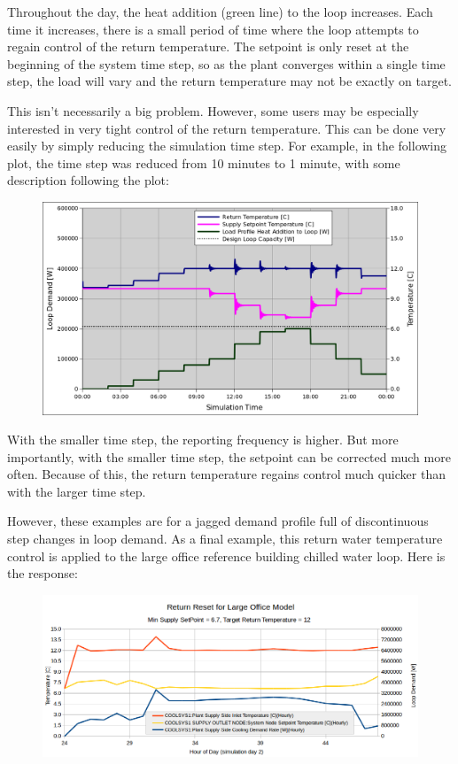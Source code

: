 Throughout the day, the heat addition (green line) to the loop increases. Each time it increases, there is a small period of time where the loop attempts to regain control of the return temperature. The setpoint is only reset at the beginning of the system time step, so as the plant converges within a single time step, the load will vary and the return temperature may not be exactly on target.

This isn't necessarily a big problem. However, some users may be especially interested in very tight control of the return temperature. This can be done very easily by simply reducing the simulation time step. For example, in the following plot, the time step was reduced from 10 minutes to 1 minute, with some description following the plot:

\begin{figure}[htbp]
\centering
\includegraphics{media/SetPointManager-ResetForReturnControl2.png}
\caption{}
\end{figure}

With the smaller time step, the reporting frequency is higher. But more importantly, with the smaller time step, the setpoint can be corrected much more often. Because of this, the return temperature regains control much quicker than with the larger time step.

However, these examples are for a jagged demand profile full of discontinuous step changes in loop demand. As a final example, this return water temperature control is applied to the large office reference building chilled water loop. Here is the response:

\begin{figure}[htbp]
\centering
\includegraphics{media/SetPointManager-ResetForReturnControl3.png}
\caption{}
\end{figure}


